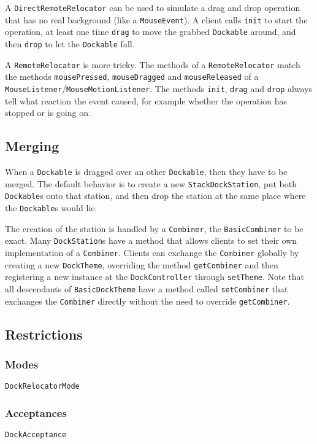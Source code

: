 \documentclass[a4paper,10pt]{article}
\newcommand{\src}[1]{\lstinline[basicstyle=\ttfamily]|#1|}
\begin{document}
A \src{DirectRemoteRelocator} can be used to simulate a drag and drop operation that has no real background (like a \src{MouseEvent}). A client calls \src{init} to start the operation, at least one time \src{drag} to move the grabbed \src{Dockable} around, and then \src{drop} to let the \src{Dockable} fall.

A \src{RemoteRelocator} is more tricky. The methods of a \src{RemoteRelocator} match the methods \src{mousePressed}, \src{mouseDragged} and \src{mouseReleased} of a \src{MouseListener}/\src{MouseMotionListener}. The methods \src{init}, \src{drag} and \src{drop} always tell what reaction the event caused, for example whether the operation has stopped or is going on.

\subsection{Merging}
When a \src{Dockable} is dragged over an other \src{Dockable}, then they have to be merged. The default behavior is to create a new \src{StackDockStation}, put both \src{Dockable}s onto that station, and then drop the station at the same place where the \src{Dockable}s would lie.

The creation of the station is handled by a \src{Combiner}, the \src{BasicCombiner} to be exact. Many \src{DockStation}s have a method that allows clients to set their own implementation of a \src{Combiner}. Clients can exchange the \src{Combiner} globally by creating a new \src{DockTheme}, overriding the method \src{getCombiner} and then registering a new instance at the \src{DockController} through \src{setTheme}. Note that all descendants of \src{BasicDockTheme} have a method called \src{setCombiner} that exchanges the \src{Combiner} directly without the need to override \src{getCombiner}.

\subsection{Restrictions}


\subsubsection{Modes}
\src{DockRelocatorMode}
\subsubsection{Acceptances}
\src{DockAcceptance}
\end{document}
